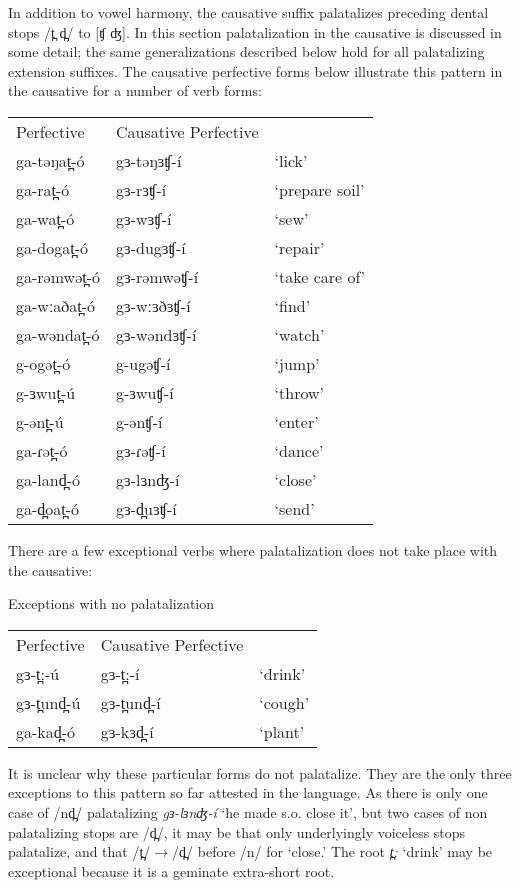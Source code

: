 In addition to vowel harmony, the causative suffix palatalizes preceding dental stops /t̪ d̪/  to [ʧ ʤ]. In this section palatalization in the causative is discussed in some detail; the same generalizations described below hold for all palatalizing extension suffixes. The causative perfective forms below illustrate this pattern in the causative for a number of verb forms:
\ea   \begin{tabular}[t]{lll}     
Perfective	& Causative Perfective 	& 	 \\
ga-təŋat̪-ó	& gɜ-təŋɜʧ-í & ‘lick’	\\
ga-rat̪-ó	&	gɜ-rɜʧ-í & ‘prepare soil’\\ 
ga-wat̪-ó	&	gɜ-wɜʧ-í & ‘sew’\\
ga-dogat̪-ó	&	gɜ-dugɜʧ-í & ‘repair’\\
ga-rəmwət̪-ó&	gɜ-rəmwəʧ-í & ‘take care of’\\
ga-wːaðat̪-ó&	gɜ-wːɜðɜʧ-í & ‘find’\\
ga-wəndat̪-ó&	gɜ-wəndɜʧ-í & ‘watch’\\	
g-ogət̪-ó	&g-ugəʧ-í & ‘jump’\\
g-ɜwut̪-ú	&g-ɜwuʧ-í & ‘throw’\\
g-ənt̪-ú		&g-ənʧ-í & ‘enter’\\
ga-ɾət̪-ó		&gɜ-ɾəʧ-í & ‘dance’\\
ga-land̪-ó	&gɜ-lɜnʤ-í & ‘close’\\
ga-d̪oat̪-ó		&gɜ-d̪uɜʧ-í & ‘send’\\
\end{tabular} \z 

There are a few exceptional verbs where palatalization does not take place with the causative:

\ea Exceptions with no palatalization\\
\begin{tabular}[t]{lll}
Perfective	& 	Causative Perfective & \\
gɜ-t̪:-ú	& gɜ-t̪:-í & ‘drink’	\\ 
gɜ-t̪und̪-ú	& gɜ-t̪und̪-í & ‘cough’	\\ 
ga-kad̪-ó	& gɜ-kɜd̪-í & ‘plant’	\\	
\end{tabular} \z 
It is unclear why these particular forms do not palatalize. They are the only three exceptions to this pattern so far attested in the language. As there is only one case of /nd̪/ palatalizing \textit{gɜ-lɜnʤ-í} `he made s.o. close it', but two cases of non palatalizing stops are /d̪/, it may be that only underlyingly voiceless stops palatalize, and that /t̪/$\to$/d̪/ before /n/ for `close.' The root \textit{t̪:} `drink' may be exceptional because it is a geminate extra-short root.

